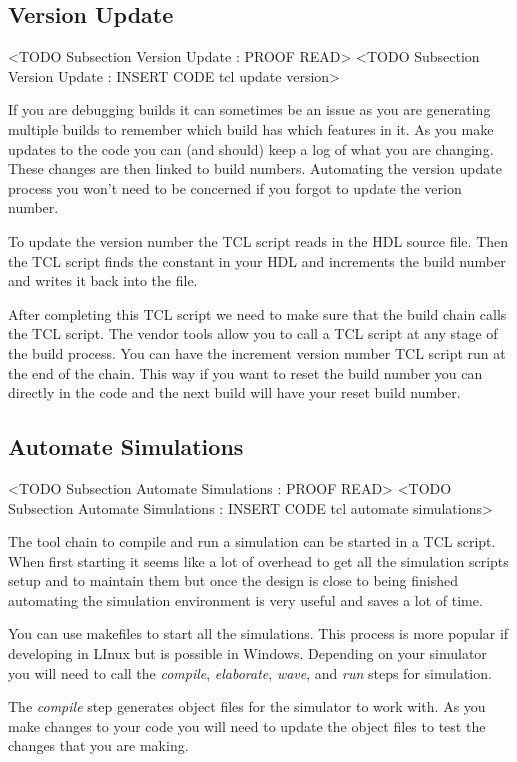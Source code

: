 \subsection{Version Update}
	<TODO Subsection Version Update : PROOF READ>
	<TODO Subsection Version Update : INSERT CODE tcl update version>

If you are debugging builds it can sometimes be an issue as you are generating multiple builds to remember which build has which features in it. As you make updates to the code you can (and should) keep a log of what you are changing. These changes are then linked to build numbers. Automating the version update process you won't need to be concerned if you forgot to update the verion number.
	
To update the version number the \ac{TCL} script reads in the \ac{HDL} source file. Then the \ac{TCL} script finds the constant in your \ac{HDL} and increments the build number and writes it back into the file. 

After completing this \ac{TCL} script we need to make sure that the build chain calls the \ac{TCL} script. The vendor tools allow you to call a \ac{TCL} script at any stage of the build process. You can have the increment version number \ac{TCL} script run at the end of the chain. This way if you want to reset the build number you can directly in the code and the next build will have your reset build number. 
	
\subsection{Automate Simulations}
	<TODO Subsection Automate Simulations : PROOF READ>
	<TODO Subsection Automate Simulations : INSERT CODE tcl automate simulations>

The tool chain to compile and run a simulation can be started in a \ac{TCL} script. When first starting it seems like a lot of overhead to get all the simulation scripts setup and to maintain them but once the design is close to being finished automating the simulation environment is very useful and saves a lot of time. 

You can use makefiles to start all the simulations. This process is more popular if developing in LInux but is possible in Windows. Depending on your simulator you will need to call the \emph{compile}, \emph{elaborate}, \emph{wave}, and \emph{run} steps for simulation. 

The \emph{compile} step generates object files for the simulator to work with. As you make changes to your code you will need to update the object files to test the changes that you are making. 

